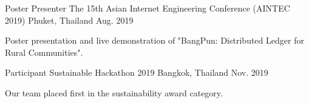 

\begin{cventries}

  \cventry
    {Poster Presenter} %
    {The 15th Asian Internet Engineering Conference (AINTEC 2019)} %
    {Phuket, Thailand} %
    {Aug. 2019} %
    {
      \begin{cvitems} %
        \item { Poster presentation and live demonstration of "BangPun: Distributed Ledger for Rural Communities".}
      \end{cvitems}
    }

  \cventry
    {Participant} %
    {Sustainable Hackathon 2019} %
    {Bangkok, Thailand} %
    {Nov. 2019} %
    {
      \begin{cvitems} %
      \item { Our team placed first in the sustainability award category. }
      \end{cvitems}
    }

\end{cventries}
